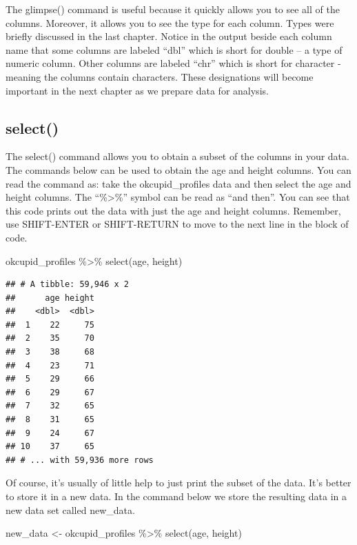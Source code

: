 \documentclass[
]{krantz}
\makeatletter
\newenvironment{Shaded}{\begin{snugshade}}{\end{snugshade}}
\newcommand{\FunctionTok}[1]{\textcolor[rgb]{0,0,0}{#1}}
\newcommand{\NormalTok}[1]{#1}
\newcommand{\OtherTok}[1]{\textcolor[rgb]{0.37,0.37,0.37}{#1}}
\newcommand{\SpecialCharTok}[1]{\textcolor[rgb]{0,0,0}{#1}}
\newenvironment{kframe}{%
\medskip{}
\setlength{\fboxsep}{.8em}
 \def\at@end@of@kframe{}%
 \ifinner\ifhmode%
  \def\at@end@of@kframe{\end{minipage}}%
  \begin{minipage}{\columnwidth}%
 \fi\fi%
 \def\FrameCommand##1{\hskip\@totalleftmargin \hskip-\fboxsep
 \colorbox{shadecolor}{##1}\hskip-\fboxsep
     \hskip-\linewidth \hskip-\@totalleftmargin \hskip\columnwidth}%
 \MakeFramed {\advance\hsize-\width
   \@totalleftmargin\z@ \linewidth\hsize
   \@setminipage}}%
 {\par\unskip\endMakeFramed%
 \at@end@of@kframe}
\renewenvironment{Shaded}{\begin{kframe}}{\end{kframe}}
\makeatother
\begin{document}
The glimpse() command is useful because it quickly allows you to see all of the columns. Moreover, it allows you to see the type for each column. Types were briefly discussed in the last chapter. Notice in the output beside each column name that some columns are labeled ``dbl'' which is short for double -- a type of numeric column. Other columns are labeled ``chr'' which is short for character - meaning the columns contain characters. These designations will become important in the next chapter as we prepare data for analysis.

\hypertarget{select}{%
\subsection{select()}\label{select}}

The select() command allows you to obtain a subset of the columns in your data. The commands below can be used to obtain the age and height columns. You can read the command as: take the okcupid\_profiles data and then select the age and height columns. The ``\%\textgreater\%'' symbol can be read as ``and then''. You can see that this code prints out the data with just the age and height columns. Remember, use SHIFT-ENTER or SHIFT-RETURN to move to the next line in the block of code.

\begin{Shaded}
\begin{Highlighting}[]
\NormalTok{okcupid\_profiles }\SpecialCharTok{\%\textgreater{}\%} 
  \FunctionTok{select}\NormalTok{(age, height)}
\end{Highlighting}
\end{Shaded}

\begin{verbatim}
## # A tibble: 59,946 x 2
##      age height
##    <dbl>  <dbl>
##  1    22     75
##  2    35     70
##  3    38     68
##  4    23     71
##  5    29     66
##  6    29     67
##  7    32     65
##  8    31     65
##  9    24     67
## 10    37     65
## # ... with 59,936 more rows
\end{verbatim}

Of course, it's usually of little help to just print the subset of the data. It's better to store it in a new data. In the command below we store the resulting data in a new data set called new\_data.

\begin{Shaded}
\begin{Highlighting}[]
\NormalTok{new\_data }\OtherTok{\textless{}{-}}\NormalTok{ okcupid\_profiles }\SpecialCharTok{\%\textgreater{}\%} 
  \FunctionTok{select}\NormalTok{(age, height)}
\end{Highlighting}
\end{Shaded}
\end{document}
